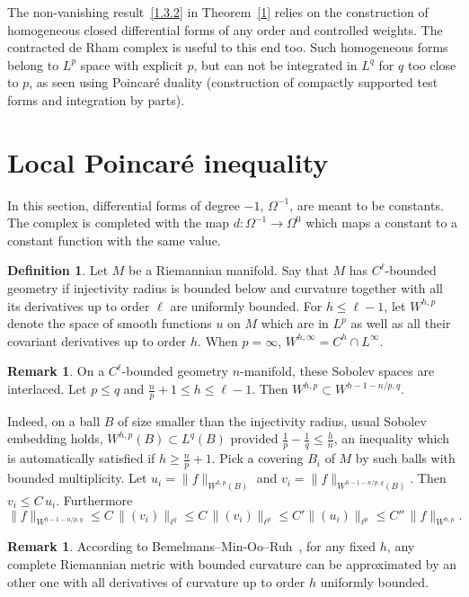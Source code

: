 \documentclass[11pt]{article}
\theoremstyle{definition}
\newtheorem{defi}[theo]{Definition}
\newtheorem{rema}[theo]{Remark}
\numberwithin{equation}{section}
\numberwithin{figure}{section}
\numberwithin{table}{section}
\begin{document}

The non-vanishing result~\eqref{1.3.2} in Theorem~\ref{1} relies on the construction of homogeneous closed differential forms of any order and controlled weights. The contracted de Rham complex is useful to this end too. Such homogeneous forms belong to $L^p$ space with explicit $p$, but can not be integrated in $L^q$ for $q$ too close to $p$, as seen using Poincar\'e duality (construction of compactly supported test forms and integration by parts).


\section{Local Poincar\'e inequality}

In this section, differential forms of degree $-1$, $\Omega^{-1}$, are meant to be constants. The complex is completed with the map $d:\Omega^{-1}\to\Omega^0$ which maps a constant to a constant function with the same value.

\begin{defi}
Let $M$ be a Riemannian manifold. Say that $M$ has $C^\ell$-bounded geometry if injectivity radius is bounded below and curvature together with all its derivatives up to order $\ell$ are uniformly bounded. For $h \leq \ell-1$, let $W^{h,p}$ denote the space of smooth functions $u$ on $M$ which are in $L^p$ as well as all their covariant derivatives up to order $h$. When $p=\infty$, $W^{h,\infty}=C^h\cap L^{\infty}$.
\end{defi}

\begin{rema}\label{whpdecr}
On a $C^\ell$-bounded geometry $n$-manifold, these Sobolev spaces are interlaced. Let $p \leq q$ and $\frac{n}{p} +1 \leq h \leq \ell-1$. Then $W^{h,p}\subset W^{h -1- n/p,q}$.
\end{rema}

Indeed, on a ball $B$ of size smaller than the injectivity radius, usual Sobolev embedding holds, $W^{h,p}(B)\subset L^q(B)$ provided $\frac{1}{p}-\frac{1}{q}\leq \frac{h}{n}$, an inequality which is automatically satisfied if $h\geq \frac{n}{p}+1$. Pick a covering $B_i$ of $M$ by such balls with bounded multiplicity. Let $u_i=\|f\|_{W^{h,p}(B)}$ and $v_i=\|f\|_{W^{h-1 -n/p,q}(B)}$. Then $v_i\leq C\,u_i$. Furthermore
\[
\|f\|_{W^{h-1 -n/p,q}}\leq C\,\|(v_i)\|_{\ell^q}\leq C\,\|(v_i)\|_{\ell^p}\leq C'
\|(u_i)\|_{\ell^p}\leq C''\,\|f\|_{W^{h,p}}.
\]

\begin{rema}
According to Bemelmans--Min-Oo--Ruh~\cite{B-MinOo-Ruh}, for any fixed $h$, any complete Riemannian metric with bounded curvature can be approximated by an other one with all derivatives of curvature up to order $h$ uniformly bounded.
\end{rema}
\end{document}
